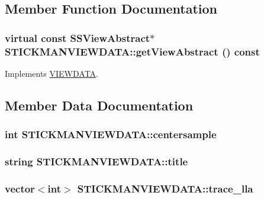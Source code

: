 \subsection{Member Function Documentation}
\hypertarget{class_s_t_i_c_k_m_a_n_v_i_e_w_d_a_t_a_609a042318ede3d5379050bfe6945c65}{
\subsubsection[{getViewAbstract}]{\setlength{\rightskip}{0pt plus 5cm}virtual const SSViewAbstract$\ast$ STICKMANVIEWDATA::getViewAbstract () const}}
\label{class_s_t_i_c_k_m_a_n_v_i_e_w_d_a_t_a_609a042318ede3d5379050bfe6945c65}




Implements \hyperlink{class_v_i_e_w_d_a_t_a_1b4cca271e32b8d47b615e75dbf0624e}{VIEWDATA}.

\subsection{Member Data Documentation}
\hypertarget{class_s_t_i_c_k_m_a_n_v_i_e_w_d_a_t_a_439f0f54a6d471eee8a190658b1c93e1}{
\subsubsection[{centersample}]{\setlength{\rightskip}{0pt plus 5cm}int {\bf STICKMANVIEWDATA::centersample}}}
\label{class_s_t_i_c_k_m_a_n_v_i_e_w_d_a_t_a_439f0f54a6d471eee8a190658b1c93e1}


\hypertarget{class_s_t_i_c_k_m_a_n_v_i_e_w_d_a_t_a_47ccaf35142e15eb15c16e75dd8a541c}{
\subsubsection[{title}]{\setlength{\rightskip}{0pt plus 5cm}string {\bf STICKMANVIEWDATA::title}}}
\label{class_s_t_i_c_k_m_a_n_v_i_e_w_d_a_t_a_47ccaf35142e15eb15c16e75dd8a541c}


\hypertarget{class_s_t_i_c_k_m_a_n_v_i_e_w_d_a_t_a_922547581d0b1509e7cbc1b3f8d9582a}{
\subsubsection[{trace\_\-lla}]{\setlength{\rightskip}{0pt plus 5cm}vector$<$int$>$ {\bf STICKMANVIEWDATA::trace\_\-lla}}}
\label{class_s_t_i_c_k_m_a_n_v_i_e_w_d_a_t_a_922547581d0b1509e7cbc1b3f8d9582a}


